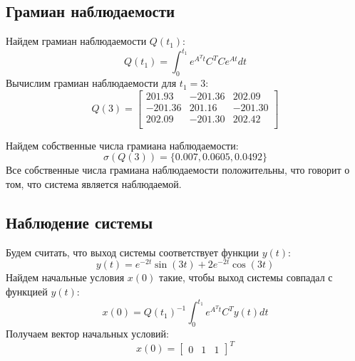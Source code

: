 \subsection{Грамиан наблюдаемости}
Найдем грамиан наблюдаемости $Q(t_1)$:
\begin{equation}
    Q(t_1) = \int_0^{t_1} e^{A^Tt}C^TCe^{At}dt
\end{equation}
Вычислим грамиан наблюдаемости для $t_1 = 3$:
\begin{equation}
    Q(3) = \begin{bmatrix}
        201.93  & -201.36  & 202.09 \\ 
        -201.36  & 201.16  & -201.30 \\ 
        202.09  & -201.30  & 202.42 \\ 
        \end{bmatrix}
\end{equation}

Найдем собственные числа грамиана наблюдаемости:
\begin{equation}
    \sigma(Q(3)) = \{0.007, 0.0605, 0.0492\}
\end{equation}
Все собственные числа грамиана наблюдаемости положительны, что говорит о том, что система является наблюдаемой.

\subsection{Наблюдение системы}
Будем считать, что выход системы соответствует функции $y(t)$:
\begin{equation}
    y(t) = e^{-2t} \sin(3t) +2e^{-2t} \cos(3t) 
\end{equation}
Найдем начальные условия $x(0)$ такие, чтобы выход системы совпадал с функцией $y(t)$:
\begin{equation}
    x(0) = Q(t_1)^{-1} \int_0^{t_1} e^{A^Tt}C^Ty(t)dt
\end{equation}
Получаем вектор начальных условий:
\begin{equation}
    x(0) = \begin{bmatrix}
        0 & 1 & 1
    \end{bmatrix}^T
\end{equation}

